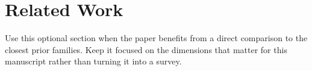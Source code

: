 \section{Related Work}

Use this optional section when the paper benefits from a direct comparison to the closest prior families. Keep it focused on the dimensions that matter for this manuscript rather than turning it into a survey.
